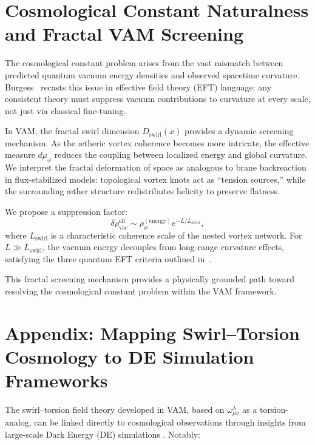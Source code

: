 \documentclass[12pt]{article}
\begin{document}
    \appendix
    \section{Cosmological Constant Naturalness and Fractal VAM Screening}

    The cosmological constant problem arises from the vast mismatch between predicted quantum vacuum energy densities and observed spacetime curvature. Burgess~\cite{burgessCCProblem} recasts this issue in effective field theory (EFT) language: any consistent theory must suppress vacuum contributions to curvature at every scale, not just via classical fine-tuning.

    In VAM, the fractal swirl dimension \( D_\text{swirl}(x) \) provides a dynamic screening mechanism. As the ætheric vortex coherence becomes more intricate, the effective measure \( d\mu_\omega \) reduces the coupling between localized energy and global curvature. We interpret the fractal deformation of space as analogous to brane backreaction in flux-stabilized models: topological vortex knots act as ``tension sources,'' while the surrounding æther structure redistributes helicity to preserve flatness.

    We propose a suppression factor:
    \[
        \delta \rho_\text{vac}^{\text{eff}} \sim \rho_\text{\ae}^{(\text{energy})} e^{-L / L_\text{swirl}},
    \]
    where \( L_\text{swirl} \) is a characteristic coherence scale of the nested vortex network. For \( L \gg L_\text{swirl} \), the vacuum energy decouples from long-range curvature effects, satisfying the three quantum EFT criteria outlined in~\cite{burgessCCProblem}.

    This fractal screening mechanism provides a physically grounded path toward resolving the cosmological constant problem within the VAM framework.

    \appendix
    \section*{Appendix: Mapping Swirl–Torsion Cosmology to DE Simulation Frameworks}

    The swirl–torsion field theory developed in VAM, based on $\omega^\lambda_{\mu\nu}$ as a torsion-analog, can be linked directly to cosmological observations through insights from large-scale Dark Energy (DE) simulations \cite{baldi2012dark}. Notably:
\end{document}
